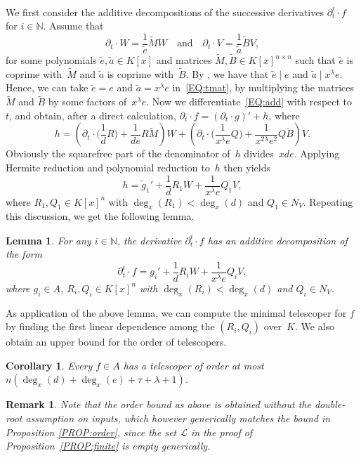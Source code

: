 \documentclass[final,1p,times,authoryear]{elsarticle}
\newtheorem{corollary}[theorem]{Corollary}
\newtheorem{lemma}[theorem]{Lemma}
\newtheorem{remark}[theorem]{Remark}
\newcommand{\bN}{ {\mathbb N}}
\begin{document}
We first consider the additive decompositions of the successive derivatives $\partial_t^i\cdot f$ for $i\in \bN$.
Assume that
\begin{equation}\label{EQ:tmat}
  \partial_t\cdot W = \frac{1}{\tilde{e}} \tilde{M}W
  \quad \text{and}\quad
  \partial_t\cdot V = \frac{1}{\tilde{a}} \tilde{B}V,
\end{equation}
for some polynomials $\tilde{e},\tilde{a}\in K[x]$ and matrices
$\tilde{M},\tilde{B}\in K[x]^{n\times n}$ such that $\tilde{e}$ is coprime
with~$\tilde{M}$ and $\tilde{a}$ is coprime with~$\tilde{B}$.  By
\cite[Prop.~7]{chen14a}, we have that $\tilde e \mid e$ and $\tilde{a} \mid
x^\lambda e$.  Hence, we can take $\tilde{e} = e$ and $\tilde{a} = x^\lambda
e$ in~\eqref{EQ:tmat}, by multiplying the matrices $\tilde{M}$ and $\tilde{B}$
by some factors of~$x^\lambda e$. Now we differentiate~\eqref{EQ:add} with
respect to~$t$, and obtain, after a direct calculation, $\partial_t\cdot f =
(\partial_t\cdot g)' + h$, where
\[
  h =
    \left(\partial_t\cdot\biggl(\frac{1}{d}R\biggr) + \frac{1}{de}R\tilde{M}\right)W +
    \left(\partial_t\cdot\biggl(\frac{1}{x^\lambda e}Q\biggr) + \frac{1}{x^{2\lambda} e^2}Q\tilde{B}\right)V.
\]
Obviously the squarefree part of the denominator of~$h$
divides~$xde$. Applying Hermite reduction and polynomial reduction to~$h$
then yields
\[
  h = \tilde g_1' + \frac{1}{d} R_1W + \frac{1}{x^\lambda e} Q_1V,
\]
where $R_1, Q_1\in K[x]^n$ with $\deg_x(R_1) < \deg_x(d)$ and $Q_1\in N_V$.
Repeating this discussion, we get the following lemma.
\begin{lemma}\label{LEM:idtf}
For any $i\in \bN$, the derivative $\partial_t^i\cdot f$ has an additive decomposition of the form
\[ \partial_t^i\cdot f = g_i' + \frac{1}{d} R_iW + \frac{1}{x^\lambda e} Q_iV,\]
where $g_i\in A$, $R_i, Q_i\in K[x]^n$ with $\deg_x(R_i) < \deg_x(d)$ and $Q_i\in N_V$.
\end{lemma}
As application of the above lemma, we can compute the minimal telescoper for $f$ by finding the first
linear dependence among the $(R_i, Q_i)$ over~$K$. We also obtain an upper bound for the order of telescopers.
\begin{corollary}
Every $f\in A$ has a telescoper of order at most $n(\deg_x(d)  +\deg_x(e) + \tau + \lambda + 1)$.
\end{corollary}

\begin{remark}
Note that the order bound as above is obtained without the double-root assumption on inputs, which however
generically matches the bound in Proposition \ref{PROP:order}, since the set $\mathcal{L}$ in the
proof of Proposition~\ref{PROP:finite} is empty generically.
\end{remark}
\end{document}
